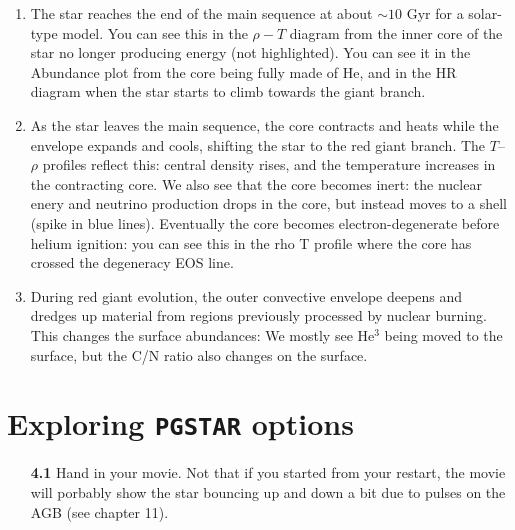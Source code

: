 \documentclass[11pt,a4paper]{article}
\begin{document}
\begin{enumerate}
\begin{enumerate}
\item The star reaches the end of the main sequence at about $\sim 10$ Gyr for a solar-type model.
You can see this in the $\rho-T$ diagram from the inner core of the star no longer producing energy (not highlighted). You can see it in the Abundance plot from the core being fully made of He, and in the HR diagram when the star starts to climb towards the giant branch.


\item 
As the star leaves the main sequence, the core contracts and heats while the envelope expands and cools, shifting the star to the red giant branch. The $T$–$\rho$ profiles reflect this: central density rises, and the temperature increases in the contracting core. 
We also see that the core becomes inert: the nuclear enery and neutrino production drops in the core, but instead moves to a shell (spike in blue lines).
Eventually the core becomes electron-degenerate before helium ignition: you can see this in the rho T profile where the core has crossed the degeneracy EOS line. 


\item 
During red giant evolution, the outer convective envelope deepens and dredges up material from regions previously processed by nuclear burning. This changes the surface abundances: We mostly see He$^3$ being moved to the surface, but the C/N ratio also changes on the surface. 


\end{enumerate}


\end{enumerate}

\section{Exploring \texttt{PGSTAR} options} 

\begin{enumerate}
  \item[\bf{4.1}] 
Hand in your movie. Not that if you started from your restart, the movie will porbably show the star bouncing up and down a bit due to pulses on the AGB (see chapter 11). 
\end{enumerate}







\end{document}
